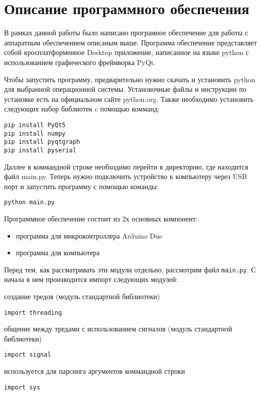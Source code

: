 \documentclass[../main.tex]{subfiles}
\begin{document}
\section{Описание программного обеспечения}

В рамках данной работы было написано програмное обеспечение для работы с аппаратным обеспечением описаным выше. Программа обеспечение представляет собой кросплатформенное Desktop приложение, написанное на языке python с использованием графического фреймворка PyQt.

Чтобы запустить программу, предварительно нужно скачать и установить python для выбранной операционной системы. Установочные файлы и инструкции по установке есть на официальном сайте python.org. Также необходимо установить следующих набор библиотек c помощью комманд:

\begin{lstlisting}
pip install PyQt5
pip install numpy
pip install pyqtgraph
pip install pyserial
\end{lstlisting}

Даллее в коммандной строке необходимо перейти в директорию, где находится файл main.py. Теперь нужно подключить устройство к компьютеру через USB порт и запустить программу с помощью команды:

\begin{lstlisting}
python main.py
\end{lstlisting}


Программное обеспечение состоит из 2х основных компонент:
\begin{itemize}
    \item программа для микроконтроллера Arduino Due
    \item программа для компьютера
\end{itemize}

Перед тем, как рассматривать эти модули отдельно, рассмотрим файл \verb|main.py|. С начала в нем производится импорт следующих модулей:

создание тредов (модуль стандартной библиотеки)
\begin{lstlisting}
import threading       
\end{lstlisting}

общение между тредами с использованием сигналов (модуль стандартной библиотеки)
\begin{lstlisting}
import signal
\end{lstlisting}

используется для парсинга аргументов коммандной строки
\begin{lstlisting}
import sys
\end{lstlisting}
\end{document}
